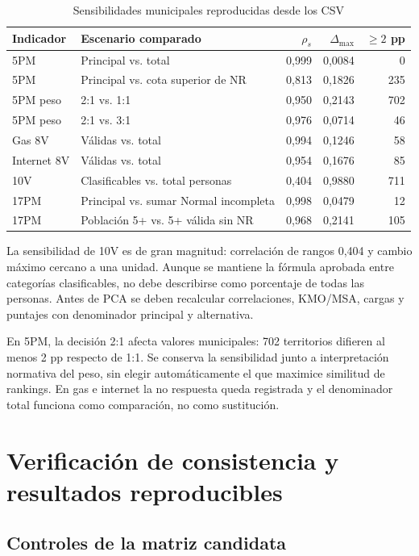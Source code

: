 \documentclass[11pt,a4paper]{article}
\begin{document}
\begin{table}[htbp]
\centering\small
\caption{Sensibilidades municipales reproducidas desde los CSV}
\label{tab:sensibilidad}
\begin{tabular}{P{0.18\textwidth}P{0.38\textwidth}r r r}
\toprule
\textbf{Indicador} & \textbf{Escenario comparado} & $\rho_s$ & $\Delta_{\max}$ & $\geq2$ pp\\
\midrule
5PM & Principal vs. total & 0,999 & 0,0084 & 0\\
5PM & Principal vs. cota superior de NR & 0,813 & 0,1826 & 235\\
5PM peso & 2:1 vs. 1:1 & 0,950 & 0,2143 & 702\\
5PM peso & 2:1 vs. 3:1 & 0,976 & 0,0714 & 46\\
Gas 8V & Válidas vs. total & 0,994 & 0,1246 & 58\\
Internet 8V & Válidas vs. total & 0,954 & 0,1676 & 85\\
10V & Clasificables vs. total personas & 0,404 & 0,9880 & 711\\
17PM & Principal vs. sumar Normal incompleta & 0,998 & 0,0479 & 12\\
17PM & Población 5+ vs. 5+ válida sin NR & 0,968 & 0,2141 & 105\\
\bottomrule
\end{tabular}
\end{table}

La sensibilidad de 10V es de gran magnitud: correlación de rangos 0,404 y cambio máximo cercano a una unidad. Aunque se mantiene la fórmula aprobada entre categorías clasificables, no debe describirse como porcentaje de todas las personas. Antes de PCA se deben recalcular correlaciones, KMO/MSA, cargas y puntajes con denominador principal y alternativa.

En 5PM, la decisión 2:1 afecta valores municipales: 702 territorios difieren al menos 2 pp respecto de 1:1. Se conserva la sensibilidad junto a interpretación normativa del peso, sin elegir automáticamente el que maximice similitud de rankings. En gas e internet la no respuesta queda registrada y el denominador total funciona como comparación, no como sustitución.

\section{Verificación de consistencia y resultados reproducibles}

\subsection{Controles de la matriz candidata}
\end{document}
